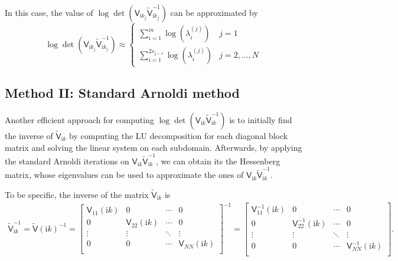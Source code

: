 In this case, the value of 
$\log\det(\mathsf{V}_{\mathrm{i}k_{j}}\tilde{\mathsf{V}}_{\mathrm{i}k_{j}}^{-1})$ can be approximated by 
\begin{equation}
    \log\det(\mathsf{V}_{\mathrm{i}k_{j}}\tilde{\mathsf{V}}_{\mathrm{i}k_{j}}^{-1})  \approx
      \begin{cases}
        \sum_{i = 1}^{m} \log\left(\lambda_{i}^{(j)}\right) & j = 1\\
        \sum_{i = 1}^{2s_{j-1}} \log\left(\lambda_{i}^{(j)}\right) & j = 2, \dots, N
      \end{cases}       
  \end{equation}

\subsection{Method II: Standard Arnoldi method}
Another efficient approach for computing $\log\det(\mathsf{V}_{\mathrm{i}k}\tilde{\mathsf{V}}_{\mathrm{i}k}^{-1})$ is to initially find the inverse of 
$\tilde{\mathsf{V}}_{\mathrm{i}k}$ by computing the LU decomposition for each diagonal block matrix and solving the linear system on each subdomain. Afterwards, 
by applying the standard Arnoldi iterations on $\mathsf{V}_{\mathrm{i}k}\tilde{\mathsf{V}}_{\mathrm{i}k}^{-1}$, we can obtain its the Hessenberg matrix,
whose eigenvalues can be used to approximate the ones of $\mathsf{V}_{\mathrm{i}k}\tilde{\mathsf{V}}_{\mathrm{i}k}^{-1}$. 

To be specific, the inverse of the matrix $\tilde{\mathsf{V}}_{\mathrm{i}k}$ is
\begin{align*}
    \tilde{\mathsf{V}}_{\mathrm{i}k}^{-1} =  \tilde{\mathsf{V}}(\mathrm{i}k)^{-1} = \begin{bmatrix}
        \mathsf{V}_{11}(\mathrm{i}k) & 0      & \cdots & 0 \\
    0      & \mathsf{V}_{22}(\mathrm{i}k) & \cdots & 0\\
    \vdots & \vdots & \ddots & \vdots \\
    0      & 0      & \cdots & \mathsf{V}_{NN}(\mathrm{i}k) \\
\end{bmatrix}^{-1}
= \begin{bmatrix}
    \mathsf{V}_{11}^{-1}(\mathrm{i}k) & 0      & \cdots & 0 \\
0      & \mathsf{V}_{22}^{-1}(\mathrm{i}k) & \cdots & 0\\
\vdots & \vdots & \ddots & \vdots \\
0      & 0      & \cdots & \mathsf{V}_{NN}^{-1} (\mathrm{i}k)\\
\end{bmatrix}.
\end{align*}

